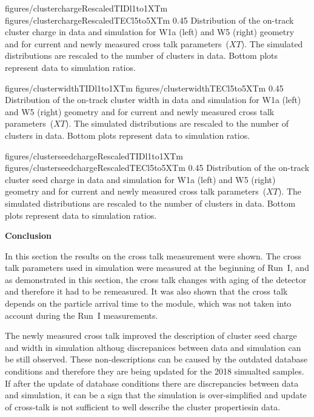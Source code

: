                  {figures/clusterchargeRescaledTIDl1to1XTm} %
                 {figures/clusterchargeRescaledTECl5to5XTm} %
                 {0.45}       %
                 { Distribution of the on-track cluster charge in data and simulation for W1a (left) and W5 (right) geometry and for current and newly measured cross talk parameters~($XT$).  The simulated distributions are rescaled to the number of clusters in data.  Bottom plots represent data to simulation ratios. }

                 {figures/clusterwidthTIDl1to1XTm}
                 {figures/clusterwidthTECl5to5XTm}
                 {0.45}       %
                 { Distribution of the on-track cluster width in data and simulation for W1a (left) and W5 (right) geometry and for current and newly measured cross talk parameters~($XT$).  The simulated distributions are rescaled to the number of clusters in data.  Bottom plots represent data to simulation ratios. }

                 {figures/clusterseedchargeRescaledTIDl1to1XTm} %
                 {figures/clusterseedchargeRescaledTECl5to5XTm} %
                 {0.45}       %
                 { Distribution of the on-track cluster seed charge in data and simulation for W1a (left) and W5 (right) geometry and for current and newly measured cross talk parameters~($XT$).  The simulated distributions are rescaled to the number of clusters in data.  Bottom plots represent data to simulation ratios. }

\textbf{Conclusion}

In this section the results on the cross talk measurement were shown. The cross talk parameters used in simulation were measured at the beginning of Run~I, and as demonstrated in this section, the cross talk changes with aging of the detector and therefore it had to be remeasured. It was also shown that the cross talk depends on the particle arrival time to the module, which was not taken into account during the Run~I measurements. 

The newly measured cross talk improved the description of cluster seed charge and width in  simulation althoug discrepanices between data and simulation can be still observed. These non-descriptions can be caused by the outdated database conditions and therefore they are being updated for the 2018 simualted samples. If after the update of database conditions there are discrepancies between data and simulation, it can be a sign that the simulation is over-simplified and update of cross-talk is not sufficient to well describe the cluster propertiesin data.


